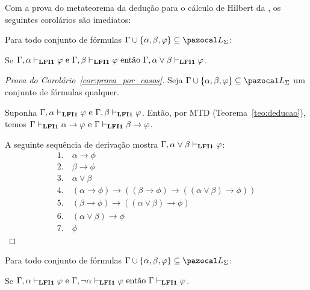     Com a prova do metateorema da dedução para o cálculo de Hilbert da \lfium{}, os seguintes corolários são imediatos:

    \begin{corolario}\label{cor:prova_por_casos}
        Para todo conjunto de fórmulas $\Gamma \cup \{\alpha, \beta, \phi\} \subseteq \ling{}$:

        \centering
        {\normalfont{}Se $\Gamma, \alpha \vdash_{{\normalfont\textbf{LFI1}}{}} \varphi \text{ e }\Gamma, \beta \vdash_{{\normalfont\textbf{LFI1}}{}} \varphi \text{ então } \Gamma, \alpha \lor \beta \vdash_{{\normalfont\textbf{LFI1}}{}} \varphi$.}
    \end{corolario}

    \begin{proof}[Prova do Corolário~\ref{cor:prova_por_casos}]
        Seja $\Gamma \cup \{\alpha, \beta, \phi\} \subseteq \ling{}$ um conjunto de fórmulas qualquer.
        
        Suponha $\Gamma, \alpha \vdash_{{\normalfont\textbf{LFI1}}{}} \varphi \text{ e }\Gamma, \beta \vdash_{{\normalfont\textbf{LFI1}}{}} \varphi$. 
        Então, por MTD (Teorema~\ref{teo:deducao}), temos $\Gamma \vdash_{{\normalfont\textbf{LFI1}}{}} \alpha \to \varphi \text{ e }\Gamma \vdash_{{\normalfont\textbf{LFI1}}{}} \beta \to \varphi$.

        A seguinte sequência de derivação mostra $\Gamma, \alpha \lor \beta \vdash_{{\normalfont\textbf{LFI1}}{}} \varphi$:
        \begin{align*}
            1. ~& \alpha \to \phi \tag{MTD aplicado à suposição} \\
            2. ~& \beta \to \phi \tag{MTD aplicado à suposição} \\
            3. ~& \alpha \lor \beta \tag{Premissa} \\
            4. ~& (\alpha \to \phi) \to ((\beta \to \phi) \to ((\alpha \lor \beta) \to \phi)) \tag{Ax8} \\
            5. ~& (\beta \to \phi) \to ((\alpha \lor \beta) \to \phi) \tag{MP 1, 4}\\
            6. ~& (\alpha \lor \beta) \to \phi \tag{MP 2, 5} \\
            7. ~& \phi \tag{MP 3, 6}
        \end{align*}
    \end{proof}


    \begin{corolario}\label{cor:caso_neg}
        Para todo conjunto de fórmulas $\Gamma \cup \{\alpha, \beta, \phi\} \subseteq \ling{}$:

        \centering
        {\normalfont{}Se $\Gamma, \alpha \vdash_{{\normalfont\textbf{LFI1}}{}} \varphi \text{ e }\Gamma, \neg\alpha \vdash_{{\normalfont\textbf{LFI1}}{}} \varphi \text{ então } \Gamma \vdash_{{\normalfont\textbf{LFI1}}{}} \varphi$.}
    \end{corolario}

